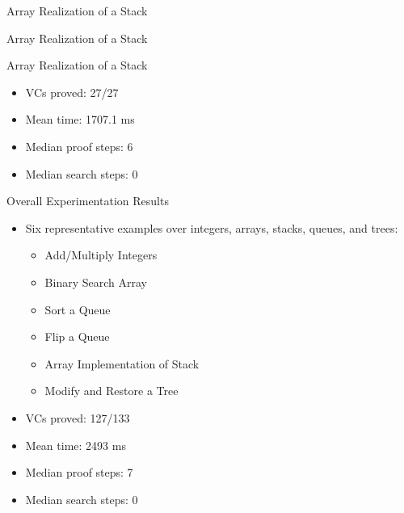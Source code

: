 \begin{frame}{Array Realization of a Stack}
	
\end{frame}


\begin{frame}{Array Realization of a Stack}
	
\end{frame}


\begin{frame}{Array Realization of a Stack}
	\begin{itemize}
		\item VCs proved: 27/27
		\item Mean time: 1707.1 ms
		\item Median proof steps: 6
		\item Median search steps: 0
	\end{itemize}
\end{frame}


\begin{frame}{Overall Experimentation Results}
	\begin{itemize}
		\item Six representative examples over integers, arrays, stacks, queues, and trees:\\
		\begin{itemize}
			\item Add/Multiply Integers
			\item Binary Search Array
			\item Sort a Queue
			\item Flip a Queue
			\item Array Implementation of Stack
			\item Modify and Restore a Tree
		\end{itemize}
		\item VCs proved: 127/133
		\item Mean time: 2493 ms
		\item Median proof steps: 7
		\item Median search steps: 0
	\end{itemize}
\end{frame}


